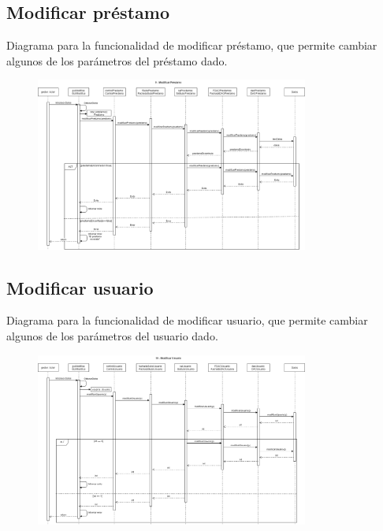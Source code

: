 \documentclass[12pt]{article}
\begin{document}
\subsection{Modificar préstamo}
Diagrama para la funcionalidad de modificar préstamo, que permite cambiar algunos de los parámetros del préstamo dado.
\begin{figure}[H]
    \centering
    \includegraphics[width=0.8\textwidth]{images/9-GestorModificaPrestamoFinal.png}
\end{figure}
\subsection{Modificar usuario}
Diagrama para la funcionalidad de modificar usuario, que permite cambiar algunos de los parámetros del usuario dado.
\begin{figure}[H]
    \centering
    \includegraphics[width=0.8\textwidth]{images/10._ModificarUsuario.png}
\end{figure}
\newpage
\end{document}
